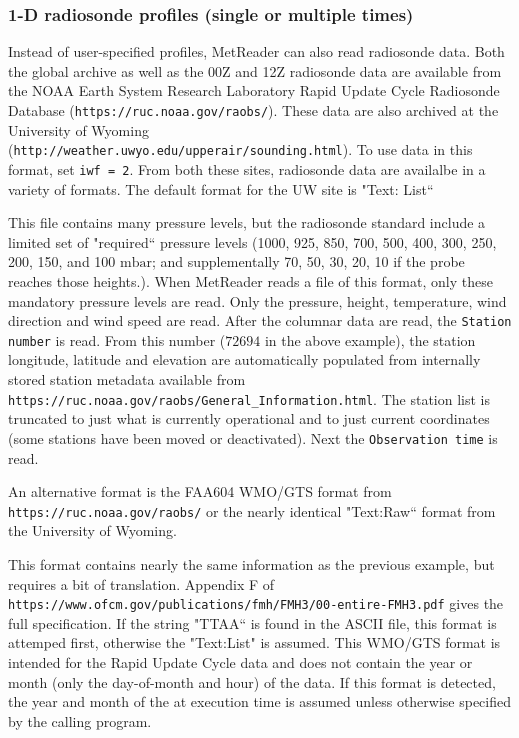 \documentclass[11pt]{article}   %
\begin{document}
\subsubsection{1-D radiosonde profiles (single or multiple times)}
Instead of user-specified profiles, MetReader can also read radiosonde data.
Both the global archive as well as the 00Z and 12Z radiosonde data are
available from the NOAA Earth System Research Laboratory Rapid Update Cycle
Radiosonde Database (\texttt{https://ruc.noaa.gov/raobs/}).  These data
are also archived at the University of Wyoming\\
(\texttt{http://weather.uwyo.edu/upperair/sounding.html}).
To use data in this format, set \texttt{iwf = 2}.
From both these sites, radiosonde data are availalbe in a variety of formats.
The default format for the UW site is "Text: List``

\small  \normalsize

This file contains many pressure levels, but the radiosonde standard include
a limited set of "required`` pressure levels (1000, 925, 850, 700, 500,
400, 300, 250, 200, 150, and 100 $\mathrm{mbar}$; and supplementally 
70, 50, 30, 20, 10 if the probe reaches those heights.).
When MetReader reads a file of this format, only these mandatory pressure levels are
read.  Only the pressure, height, temperature, wind direction and wind speed are read.
After the columnar data are read, the \texttt{Station number} is read.  From this number
($72694$ in the above example), the station longitude, latitude and elevation are
automatically populated from internally stored station
metadata available from \texttt{https://ruc.noaa.gov/raobs/General\_Information.html}.  The
station list is truncated to just what is currently operational and to just current
coordinates (some stations have been moved or deactivated).
Next the \texttt{Observation time} is read.  

An alternative format is the FAA604 WMO/GTS format from \texttt{https://ruc.noaa.gov/raobs/}
or the nearly identical "Text:Raw`` format from the University of Wyoming.

\small  \normalsize

This format contains nearly the same information as the previous example, but 
requires a bit of translation.
Appendix F of\\
\texttt{https://www.ofcm.gov/publications/fmh/FMH3/00-entire-FMH3.pdf}
gives the full specification.
If the string "TTAA`` is found
in the ASCII file, this format is attemped first, otherwise the "Text:List" is
assumed.  This WMO/GTS format is intended for the Rapid Update Cycle data and
does not contain the year or month (only the day-of-month and hour) of the data.
If this format is detected, the year and month of the at
execution time is assumed unless otherwise
specified by the calling program.
\end{document}
